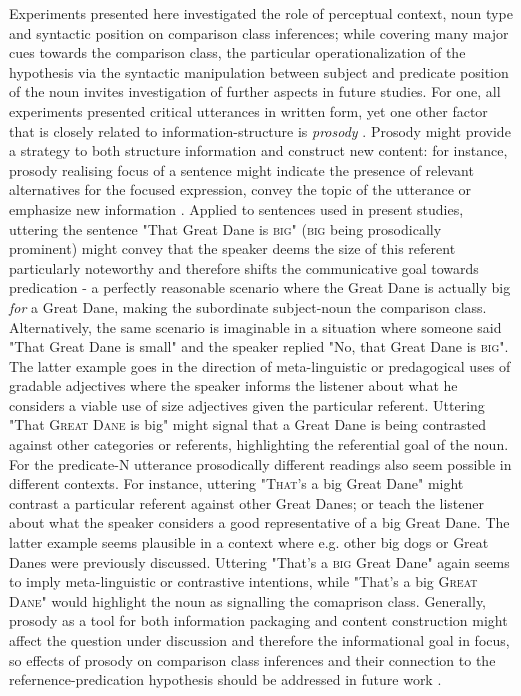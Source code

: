 Experiments presented here investigated the role of perceptual context, noun type and syntactic position on comparison class inferences; while covering many major cues towards the comparison class, the particular operationalization of the hypothesis via the syntactic manipulation between subject and predicate position of the noun invites investigation of further aspects in future studies. For one, all experiments presented critical utterances in written form, yet one other factor that is closely related to information-structure is \emph{prosody} \parencite{krifka2008basic}. Prosody might provide a strategy to both structure information and construct new content: for instance, prosody realising focus of a sentence might indicate the presence of relevant alternatives for the focused expression, convey the topic of the utterance or emphasize new information \parencite{krifka2008basic, selkirk1995sentence}. 
Applied to sentences used in present studies, uttering the sentence "That Great Dane is \textsc{big}" (\textsc{big} being prosodically prominent) might convey that the speaker deems the size of this referent particularly noteworthy and therefore shifts the communicative goal towards predication - a perfectly reasonable scenario where the Great Dane is actually big \emph{for} a Great Dane, making the subordinate subject-noun the comparison class.  Alternatively, the same scenario is imaginable in a situation where someone said "That Great Dane is small" and the speaker replied "No, that Great Dane is \textsc{big}". The latter example goes in the direction of meta-linguistic or predagogical uses of gradable adjectives where the speaker informs the listener about what he considers a viable use of size adjectives given the particular referent. Uttering "That \textsc{Great Dane} is big" might signal that a Great Dane is being contrasted against other categories or referents, highlighting the referential goal of the noun.
For the predicate-N utterance prosodically different readings also seem possible in different contexts. For instance, uttering "\textsc{That}'s a big Great Dane" might contrast a particular referent against other Great Danes; or teach the listener about what the speaker considers a good representative of a big Great Dane. The latter example seems plausible in a context where e.g. other big dogs or Great Danes were previously discussed. Uttering "That's a \textsc{big} Great Dane" again seems to imply meta-linguistic or contrastive intentions, while "That's a big \textsc{Great Dane}" would highlight the noun as signalling the comaprison class. 
Generally, prosody as a tool for both information packaging and content construction might affect the question under discussion and therefore the informational goal in focus, so effects of prosody on comparison class inferences and their connection to the refernence-predication hypothesis should be addressed in future work \parencite{krifka2008basic}. 

